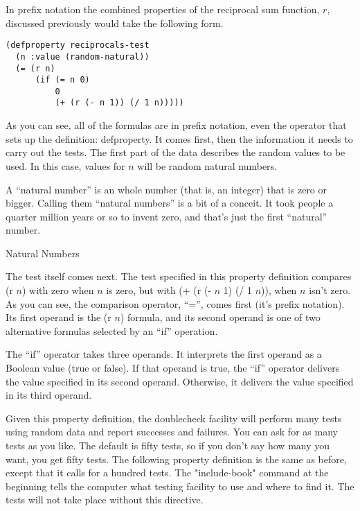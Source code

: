In prefix notation the combined properties
of the reciprocal sum function, $r$,
discussed previously would take the following form.

\label{def-property-example}
\begin{lstlisting}
(defproperty reciprocals-test
  (n :value (random-natural))
  (= (r n)
      (if (= n 0)
          0
          (+ (r (- n 1)) (/ 1 n)))))
\end{lstlisting}

As you can see, all of the formulas are in prefix notation,
even the operator that sets up the definition: defproperty.
It comes first, then  the information it needs to carry out the tests.
The first part of the data describes the random values to be used.
In this case, values for $n$ will be random natural numbers.

\begin{aside}
A ``natural number'' is an whole number (that is, an integer)
that is zero or bigger.
Calling them ``natural numbers'' is a bit of a conceit.
It took people a quarter million years or so to invent zero,
and that's just the first ``natural'' number.
\caption{Natural Numbers}
\label{natural-number-def}
\end{aside}

The test itself comes next.
The test specified in this property definition
compares (r $n$) with zero when $n$ is zero,
but with (+ (r (- $n$ 1) (/ 1 $n$)), when $n$ isn't zero.
As you can see, the comparison operator, ``='', comes first (it's prefix notation).
Its first operand is the (r $n$) formula,
and its second operand is one of two alternative formulas selected by an ``if'' operation.

\label{if-def}
The ``if'' operator takes three operands.
It interprets the first operand as a Boolean value (true or false).
If that operand is true, the ``if'' operator delivers
the value specified in its second operand.
Otherwise, it delivers the value specified in its third operand.

Given this property definition, the doublecheck facility will perform many tests using random data and report successes and failures. You can ask for as many tests as you like. The default is fifty tests, so if you don't say how many you want, you get fifty tests. The following property definition is the same as before, except that it calls for a hundred tests.
The "include-book" command at the beginning tells the computer what testing facility to use and where to find it. The tests will not take place without this directive.

